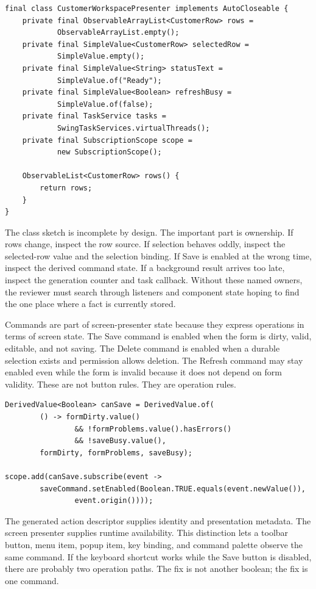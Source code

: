 \begin{lstlisting}[caption={Screen-presenter state sketch.}]
final class CustomerWorkspacePresenter implements AutoCloseable {
    private final ObservableArrayList<CustomerRow> rows =
            ObservableArrayList.empty();
    private final SimpleValue<CustomerRow> selectedRow =
            SimpleValue.empty();
    private final SimpleValue<String> statusText =
            SimpleValue.of("Ready");
    private final SimpleValue<Boolean> refreshBusy =
            SimpleValue.of(false);
    private final TaskService tasks =
            SwingTaskServices.virtualThreads();
    private final SubscriptionScope scope =
            new SubscriptionScope();

    ObservableList<CustomerRow> rows() {
        return rows;
    }
}
\end{lstlisting}

The class sketch is incomplete by design. The important part is ownership. If
rows change, inspect the row source. If selection behaves oddly, inspect the
selected-row value and the selection binding. If Save is enabled at the wrong
time, inspect the derived command state. If a background result arrives too
late, inspect the generation counter and task callback. Without these named
owners, the reviewer must search through listeners and component state hoping
to find the one place where a fact is currently stored.

Commands are part of screen-presenter state because they express operations in terms
of screen state. The Save command is enabled when the form is dirty, valid,
editable, and not saving. The Delete command is enabled when a durable
selection exists and permission allows deletion. The Refresh command may stay
enabled even while the form is invalid because it does not depend on form
validity. These are not button rules. They are operation rules.

\begin{lstlisting}[caption={Command state derived from screen facts.}]
DerivedValue<Boolean> canSave = DerivedValue.of(
        () -> formDirty.value()
                && !formProblems.value().hasErrors()
                && !saveBusy.value(),
        formDirty, formProblems, saveBusy);

scope.add(canSave.subscribe(event ->
        saveCommand.setEnabled(Boolean.TRUE.equals(event.newValue()),
                event.origin())));
\end{lstlisting}

The generated action descriptor supplies identity and presentation metadata.
The screen presenter supplies runtime availability. This distinction lets a toolbar
button, menu item, popup item, key binding, and command palette observe the
same command. If the keyboard shortcut works while the Save button is disabled,
there are probably two operation paths. The fix is not another boolean; the
fix is one command.

